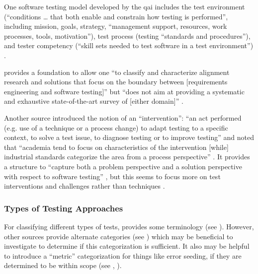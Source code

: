 One software testing model developed by the \acf{qai} includes the test
environment (``conditions \dots
that both enable and constrain how testing is performed'', including mission,
goals, strategy, ``management support, resources, work processes, tools,
motivation''), test process (testing ``standards and procedures''), and tester
competency (``skill sets needed to test software in a test environment'')
\citep[pp.~5-6]{Perry2006}.

\citep{UnterkalmsteinerEtAl2014} provides a foundation to allow one ``to
classify and characterize alignment research and solutions that focus on the
boundary between [requirements engineering and software testing]'' but ``does
not aim at providing a systematic and exhaustive state-of-the-art survey of
      [either domain]'' \citep[p.~A:2]{UnterkalmsteinerEtAl2014}.

Another source
introduced the notion of an ``intervention'': ``an act performed (e.g. use of a
technique or a process change) to adapt testing to a specific context, to solve
a test issue, to diagnose testing or to improve testing''
\citep[p.~1]{engström_mapping_2015} and noted that ``academia tend to focus on
characteristics of the intervention [while] industrial standards categorize the
area from a process perspective'' \citep[p.~2]{engström_mapping_2015}.
It provides a structure to ``capture both a problem perspective and a solution
perspective with respect to software testing'' \citep[pp.~3-4]{engström_mapping_2015},
but this seems to focus more on test interventions and challenges rather than
techniques \citep[Fig.~5]{engström_mapping_2015}.

\subsubsection{Types of Testing Approaches}

For classifying different types of tests, \citet{IEEE2022} provides some
terminology (see ). However, other sources \citep{BarbosaEtAl2006,
      SouzaEtAl2017} provide alternate
categories (see ) which may be beneficial to investigate to
determine if this categorization is sufficient. It also may be helpful to
introduce a ``metric'' categorization for things like error seeding, if they
are determined to be within scope (see , ).

\begin{landscape}
      \ieeeTestTermsTable{}
\end{landscape}

